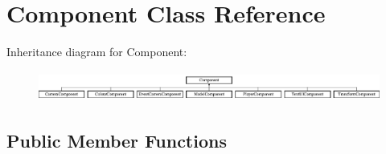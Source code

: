 \hypertarget{class_component}{}\section{Component Class Reference}
\label{class_component}
Inheritance diagram for Component\+:\begin{figure}[H]
\begin{center}
\leavevmode
\includegraphics[height=1.006289cm]{class_component}
\end{center}
\end{figure}
\subsection*{Public Member Functions}
